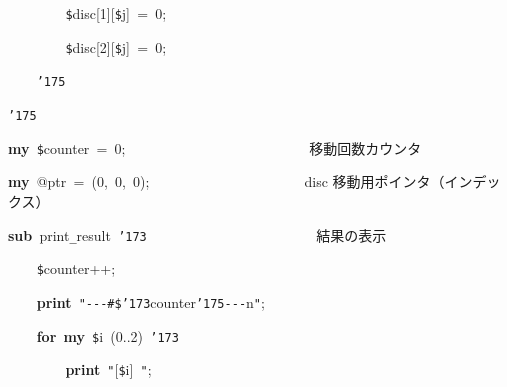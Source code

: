 \documentclass[a4paper,10pt]{article}
\def\mc{\relax}
\begin{document}
\noindent
\mbox{}{\tt\mc \ }{\tt\mc \ }{\tt\mc \ }{\tt\mc \ }{\tt\mc \ }{\tt\mc \ }{\tt\mc \ }{\tt\mc \ }{\tt\$}disc[1][{\tt\$}j]{\tt\mc \ }={\tt\mc \ }0;

\noindent
\mbox{}{\tt\mc \ }{\tt\mc \ }{\tt\mc \ }{\tt\mc \ }{\tt\mc \ }{\tt\mc \ }{\tt\mc \ }{\tt\mc \ }{\tt\$}disc[2][{\tt\$}j]{\tt\mc \ }={\tt\mc \ }0;

\noindent
\mbox{}{\tt\mc \ }{\tt\mc \ }{\tt\mc \ }{\tt\mc \ }{\tt\char'175}

\noindent
\mbox{}{\tt\char'175}

\noindent
\mbox{}\hfill

\noindent
\mbox{}\textbf{my}{\tt\mc \ }{\tt\$}counter{\tt\mc \ }={\tt\mc \ }0;{\tt\mc \ }{\tt\mc \ }{\tt\mc \ }{\tt\mc \ }{\tt\mc \ }{\tt\mc \ }{\tt\mc \ }{\tt\mc \ }{\tt\mc \ }{\tt\mc \ }{\tt\mc \ }{\tt\mc \ }{\tt\mc \ }{\tt\mc \ }{\tt\mc \ }{\tt\mc \ }{\tt\mc \ }{\tt\mc \ }{\tt\mc \ }{\tt\mc \ }{\tt\mc \ }{\tt\mc \ }{\tt\mc \ }{\tt\mc \ }\rm\mc {\tt\#} \ 移動回数カウンタ \hfill 
\tt\mc 

\noindent
\mbox{}\textbf{my}{\tt\mc \ }@ptr{\tt\mc \ }={\tt\mc \ }(0,{\tt\mc \ }0,{\tt\mc \ }0);{\tt\mc \ }{\tt\mc \ }{\tt\mc \ }{\tt\mc \ }{\tt\mc \ }{\tt\mc \ }{\tt\mc \ }{\tt\mc \ }{\tt\mc \ }{\tt\mc \ }{\tt\mc \ }{\tt\mc \ }{\tt\mc \ }{\tt\mc \ }{\tt\mc \ }{\tt\mc \ }{\tt\mc \ }{\tt\mc \ }{\tt\mc \ }{\tt\mc \ }\rm\mc {\tt\#} \ disc 移動用ポインタ（インデックス）\hfill 
\tt\mc 

\noindent
\mbox{}\hfill

\noindent
\mbox{}\textbf{sub}{\tt\mc \ }print{\tt\_}result{\tt\mc \ }{\tt\char'173}{\tt\mc \ }{\tt\mc \ }{\tt\mc \ }{\tt\mc \ }{\tt\mc \ }{\tt\mc \ }{\tt\mc \ }{\tt\mc \ }{\tt\mc \ }{\tt\mc \ }{\tt\mc \ }{\tt\mc \ }{\tt\mc \ }{\tt\mc \ }{\tt\mc \ }{\tt\mc \ }{\tt\mc \ }{\tt\mc \ }{\tt\mc \ }{\tt\mc \ }{\tt\mc \ }{\tt\mc \ }\rm\mc {\tt\#} \ 結果の表示 \hfill 
\tt\mc 

\noindent
\mbox{}{\tt\mc \ }{\tt\mc \ }{\tt\mc \ }{\tt\mc \ }{\tt\$}counter++;

\noindent
\mbox{}{\tt\mc \ }{\tt\mc \ }{\tt\mc \ }{\tt\mc \ }\textbf{print}{\tt\mc \ }{\tt "}{\tt -}{\tt -}{\tt -}{\tt\#}{\tt\$}{\tt\char'173}counter{\tt\char'175}{\tt -}{\tt -}{\tt -}{\tt{}}n{\tt "};

\noindent
\mbox{}{\tt\mc \ }{\tt\mc \ }{\tt\mc \ }{\tt\mc \ }\textbf{for}{\tt\mc \ }\textbf{my}{\tt\mc \ }{\tt\$}i{\tt\mc \ }(0..2){\tt\mc \ }{\tt\char'173}

\noindent
\mbox{}{\tt\mc \ }{\tt\mc \ }{\tt\mc \ }{\tt\mc \ }{\tt\mc \ }{\tt\mc \ }{\tt\mc \ }{\tt\mc \ }\textbf{print}{\tt\mc \ }{\tt "}[{\tt\$}i]{\tt\mc \ }{\tt "};
\end{document}
